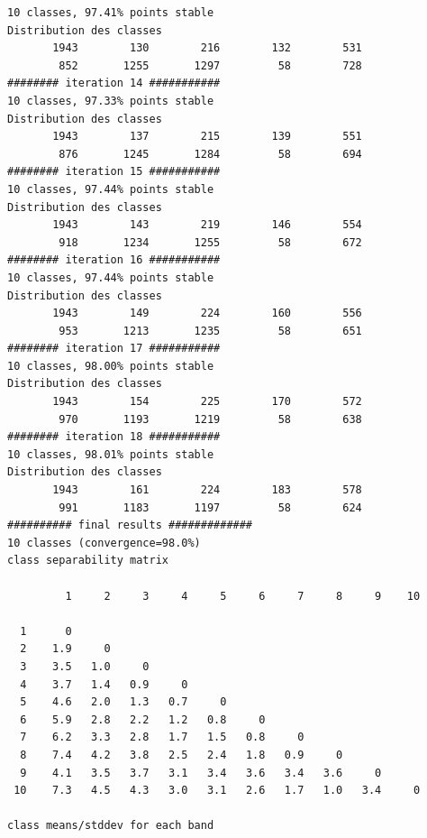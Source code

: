 \documentclass[environments,article,submit,pdftex,moreauthors]{Definitions/mdpi}
\begin{document}
\begin{scriptsize}
\begin{verbatim}
10 classes, 97.41% points stable
Distribution des classes
       1943        130        216        132        531
        852       1255       1297         58        728
######## iteration 14 ###########
10 classes, 97.33% points stable
Distribution des classes
       1943        137        215        139        551
        876       1245       1284         58        694
######## iteration 15 ###########
10 classes, 97.44% points stable
Distribution des classes
       1943        143        219        146        554
        918       1234       1255         58        672
######## iteration 16 ###########
10 classes, 97.44% points stable
Distribution des classes
       1943        149        224        160        556
        953       1213       1235         58        651
######## iteration 17 ###########
10 classes, 98.00% points stable
Distribution des classes
       1943        154        225        170        572
        970       1193       1219         58        638
######## iteration 18 ###########
10 classes, 98.01% points stable
Distribution des classes
       1943        161        224        183        578
        991       1183       1197         58        624
########## final results #############
10 classes (convergence=98.0%)
class separability matrix

         1     2     3     4     5     6     7     8     9    10

  1      0
  2    1.9     0
  3    3.5   1.0     0
  4    3.7   1.4   0.9     0
  5    4.6   2.0   1.3   0.7     0
  6    5.9   2.8   2.2   1.2   0.8     0
  7    6.2   3.3   2.8   1.7   1.5   0.8     0
  8    7.4   4.2   3.8   2.5   2.4   1.8   0.9     0
  9    4.1   3.5   3.7   3.1   3.4   3.6   3.4   3.6     0
 10    7.3   4.5   4.3   3.0   3.1   2.6   1.7   1.0   3.4     0

class means/stddev for each band


\end{verbatim}
\end{scriptsize}
\end{document}
